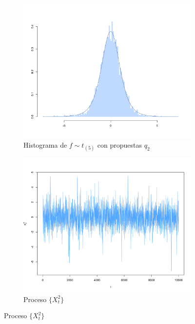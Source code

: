 \documentclass[11pt,a4paper]{article}
\begin{document}
\begin{figure}[!p]
    \vspace{0.2cm}
    
    \begin{subfigure}[t]{0.45\textwidth}
        \centering
        \includegraphics[width=\linewidth]{mh_hist_x2.png} 
        \caption{Histograma de $f \sim t_{(5)}$ con propuestas $q_2$} \label{fig:mh_hist_x2}
    \end{subfigure}
    \hfill
    \begin{subfigure}[t]{0.45\textwidth}
        \centering
        \includegraphics[width=\linewidth]{mh_chain_x2.png} 
        \caption{Proceso $\lbrace X_t^2 \rbrace$} \label{fig:mh_chain_x2}
    \end{subfigure}
    

\end{figure}
\end{document}
